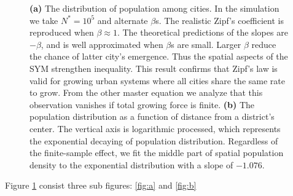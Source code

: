 \documentclass{article}
\begin{document}
	\begin{figure}[htb]
		\centering
		\hfil
		\caption{\textbf{(a)} The distribution of population among cities. In the simulation we take $N^* = 10^5$ and alternate $\beta$s. The realistic Zipf's coefficient is reproduced when $\beta\approx 1$. The theoretical predictions of the slopes are $-\beta$, and is well approximated when $\beta$s are small. Larger $\beta$ reduce the chance of latter city's emergence. Thus the spatial aspects of the SYM strengthen inequality. This result confirms that Zipf's law is valid for growing urban systems where all cities share the same rate to grow. From the other master equation we analyze that this observation vanishes if total growing force is finite. \textbf{(b)} The population distribution as a function of distance from a district's center. The vertical axis is logarithmic processed, which represents the exponential decaying of population distribution. Regardless of the finite-sample effect, we fit the middle part of spatial population density to the exponential distribution with a slope of $-1.076$.}
		\label{fig:myfigure}
	\end{figure}
	Figure \ref{fig:myfigure} consist three sub figures: \ref{fig:a} and \ref{fig:b}
\end{document}
